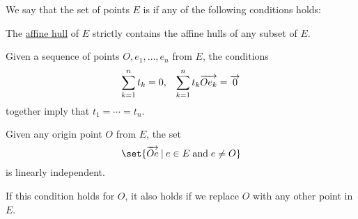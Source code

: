 \begin{definition}\label{def:affine_dependence}\mimprovised
  We say that the set of points \( E \) is  if any of the following conditions holds:

  \begin{thmenum}
     The \hyperref[def:affine_hull]{affine hull} of \( E \) strictly contains the affine hulls of any subset of \( E \).

     Given a sequence of points \( O, e_1, \ldots, e_n \) from \( E \), the conditions
    \begin{align*}
      \sum_{k=1}^n t_k = 0,
      &&
      \sum_{k=1}^n t_k \overrightarrow{O e_k} = \overrightarrow{0}
    \end{align*}
    together imply that \( t_1 = \cdots = t_n \).

     Given any origin point \( O \) from \( E \), the set
    \begin{equation*}
      \set{ \vect{O e} \given e \in E \T{and} e \neq O }
    \end{equation*}
    is linearly independent.

    If this condition holds for \( O \), it also holds if we replace \( O \) with any other point in \( E \).
  \end{thmenum}
\end{definition}
